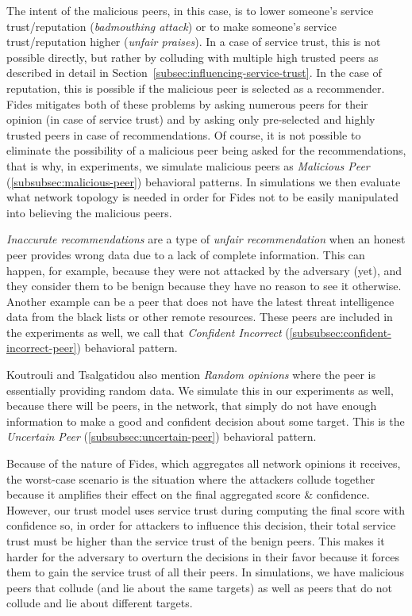 The intent of the malicious peers, in this case, is to lower someone's service trust/reputation (\textit{badmouthing attack}) or to make someone's service trust/reputation higher (\textit{unfair praises}).
In a case of service trust, this is not possible directly, but rather by colluding with multiple high trusted peers as described in detail in Section~\ref{subsec:influencing-service-trust}.
In the case of reputation, this is possible if the malicious peer is selected as a recommender.
Fides mitigates both of these problems by asking numerous peers for their opinion (in case of service trust) and by asking only pre-selected and highly trusted peers in case of recommendations.
Of course, it is not possible to eliminate the possibility of a malicious peer being asked for the recommendations, that is why, in experiments, we simulate malicious peers as \textit{Malicious Peer} (\ref{subsubsec:malicious-peer}) behavioral patterns.
In simulations we then evaluate what network topology is needed in order for Fides not to be easily manipulated into believing the malicious peers.

\textit{Inaccurate recommendations} are a type of \textit{unfair recommendation} when an honest peer provides wrong data due to a lack of complete information.
This can happen, for example, because they were not attacked by the adversary (yet), and they consider them to be benign because they have no reason to see it otherwise.
Another example can be a peer that does not have the latest threat intelligence data from the black lists or other remote resources.
These peers are included in the experiments as well, we call that \textit{Confident Incorrect} (\ref{subsubsec:confident-incorrect-peer}) behavioral pattern.

Koutrouli and Tsalgatidou \cite{KOUTROULI201247} also mention \textit{Random opinions} where the peer is essentially providing random data.
We simulate this in our experiments as well, because there will be peers, in the network, that simply do not have enough information to make a good and confident decision about some target.
This is the \textit{Uncertain Peer} (\ref{subsubsec:uncertain-peer}) behavioral pattern.

Because of the nature of Fides, which aggregates all network opinions it receives, the worst-case scenario is the situation where the attackers collude together because it amplifies their effect on the final aggregated score \& confidence.
However, our trust model uses service trust during computing the final score with confidence so, in order for attackers to influence this decision, their total service trust must be higher than the service trust of the benign peers.
This makes it harder for the adversary to overturn the decisions in their favor because it forces them to gain the service trust of all their peers.
In simulations, we have malicious peers that collude (and lie about the same targets) as well as peers that do not collude and lie about different targets.

